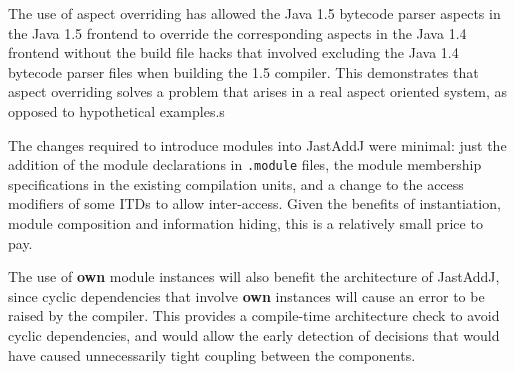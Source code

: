 

The use of aspect overriding has allowed the Java 1.5 bytecode parser aspects in the Java 1.5 frontend to
override the corresponding aspects in the Java 1.4 frontend without the build file hacks that involved
excluding the Java 1.4 bytecode parser files when building the 1.5 compiler. This demonstrates that
aspect overriding solves a problem that arises in a real aspect oriented system, as opposed to 
hypothetical examples.s


The changes required to introduce modules into JastAddJ were minimal: just the addition of the module 
declarations in \texttt{.module} files, the module membership specifications in the existing compilation units,
and a change to the access modifiers of some ITDs to allow inter-access. Given the benefits of instantiation, 
module composition and information hiding, this is a relatively small price to pay.

The use of \textbf{own} module instances will also benefit the architecture of JastAddJ,
since cyclic dependencies that involve \textbf{own} instances will cause an error to
be raised by the compiler. This provides a compile-time architecture check to avoid cyclic dependencies,
and would allow the early detection of decisions that would have caused unnecessarily
tight coupling between the components.





 
 
